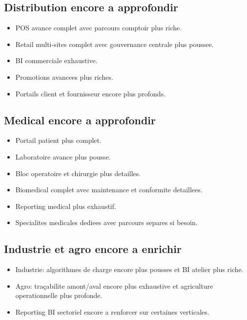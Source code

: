 \documentclass[11pt,a4paper]{article}
\begin{document}
\subsection{Distribution encore a approfondir}
\begin{itemize}[leftmargin=1.2cm]
    \item POS avance complet avec parcours comptoir plus riche.
    \item Retail multi-sites complet avec gouvernance centrale plus poussee.
    \item BI commerciale exhaustive.
    \item Promotions avancees plus riches.
    \item Portails client et fournisseur encore plus profonds.
\end{itemize}

\subsection{Medical encore a approfondir}
\begin{itemize}[leftmargin=1.2cm]
    \item Portail patient plus complet.
    \item Laboratoire avance plus pousse.
    \item Bloc operatoire et chirurgie plus detailles.
    \item Biomedical complet avec maintenance et conformite detaillees.
    \item Reporting medical plus exhaustif.
    \item Specialites medicales dediees avec parcours separes si besoin.
\end{itemize}

\subsection{Industrie et agro encore a enrichir}
\begin{itemize}[leftmargin=1.2cm]
    \item Industrie: algorithmes de charge encore plus pousses et BI atelier plus riche.
    \item Agro: traçabilite amont/aval encore plus exhaustive et agriculture operationnelle plus profonde.
    \item Reporting BI sectoriel encore a renforcer sur certaines verticales.
\end{itemize}
\end{document}
